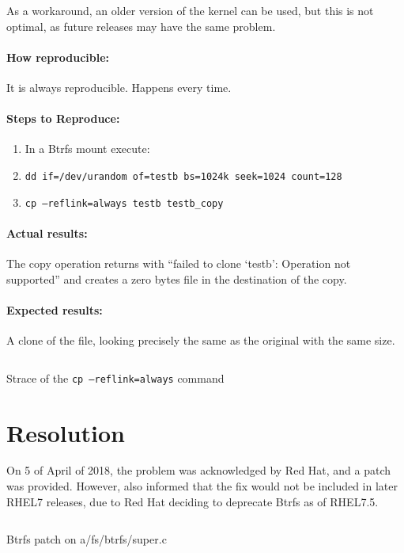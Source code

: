 As a workaround, an older version of the kernel can be used, but this is not optimal, as future releases may have the same problem.

\paragraph{How reproducible:}

It is always reproducible. Happens every time.

\paragraph{Steps to Reproduce:}

\begin{enumerate}
	\item In a Btrfs mount execute:
	\item \texttt{dd if=/dev/urandom of=testb bs=1024k seek=1024 count=128}
	\item \texttt{cp --reflink=always testb testb\_copy}
\end{enumerate}

\paragraph{Actual results:}
The copy operation returns with ``failed to clone `testb': Operation not supported'' and creates a zero bytes file in the destination of the copy.

\paragraph{Expected results:}

A clone of the file, looking precisely the same as the original with the same size.

\begin{listing}[ht]
\inputminted{bash}{./Chapters/Code/annex3_strace.sh}
\caption{Strace of the \texttt{cp --reflink=always} command}
\label{listing:bug_strace}
\end{listing}


\section{Resolution}
\label{sec:resolution}
On 5 of April of 2018, the problem was acknowledged by Red Hat, and a patch was provided. However, also informed that the fix would not be included in later RHEL7 releases, due to Red Hat deciding to deprecate Btrfs as of RHEL7.5.

\begin{listing}[ht]
\inputminted{diff}{./Chapters/Code/annex3_btrfspatch.diff}
\caption{Btrfs patch on a/fs/btrfs/super.c}
\label{listing:bug_btrfsdiff}
\end{listing}
